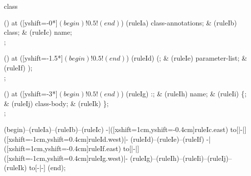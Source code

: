 \begin{syntax}{class}
  
  \node[sequence] () at ([yshift=-0*\syntaxruledist]$(begin)!0.5!(end)$) {
    \node[nonterminal] (ruleIa) {class-annotations};
    &
    \node[terminal]    (ruleIb) {class};
    &
    \node[nonterminal] (ruleIc) {name};
    \\
  };
  
  \node[sequence] () at ([yshift=-1.5*\syntaxruledist]$(begin)!0.5!(end)$) {
    \node[terminal]    (ruleId) {(};
    &
    \node[nonterminal] (ruleIe) {parameter-list};
    &
    \node[terminal]    (ruleIf) {)};
    \\
  };
  
  \node[sequence] () at ([yshift=-3*\syntaxruledist]$(begin)!0.5!(end)$) {
    \node[nonterminal] (ruleIg) {:};
    &
    \node[nonterminal] (ruleIh) {name};
    &
    \node[terminal] (ruleIi) {\{};
    &
    \node[nonterminal] (ruleIj) {class-body};
    &
    \node[terminal] (ruleIk) {\}};
    \\
  };
  
  \draw[path] (begin)--(ruleIa)--(ruleIb)--(ruleIc)
    -|([xshift=1cm,yshift=-0.4cm]ruleIc.east) to[|-|] ([xshift=-1cm,yshift=0.4cm]ruleId.west)|-
    (ruleId)--(ruleIe)--(ruleIf)
    -|([xshift=1cm,yshift=-0.4cm]ruleIf.east) to[|-|] ([xshift=-1cm,yshift=0.4cm]ruleIg.west)|-
    (ruleIg)--(ruleIh)--(ruleIi)--(ruleIj)--(ruleIk) to[-|-] (end);
\end{syntax}
